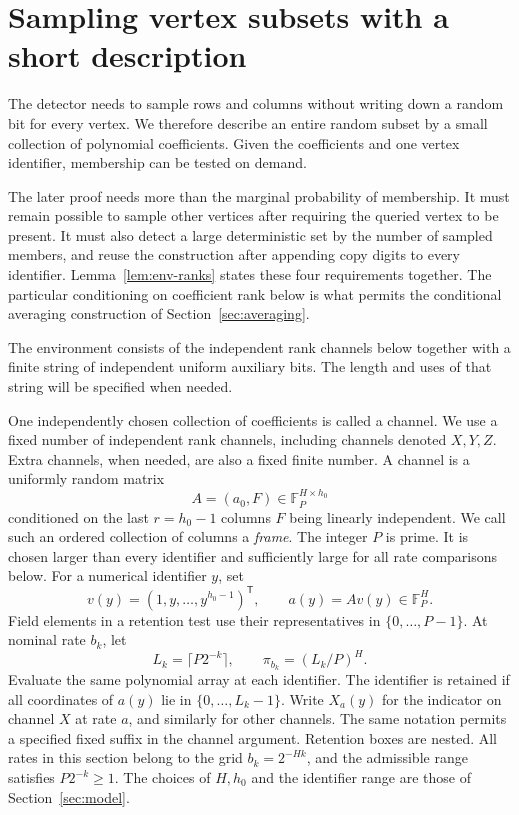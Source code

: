 \section{Sampling vertex subsets with a short description}\label{sec:env}

The detector needs to sample rows and columns without writing down a random bit for every vertex. We therefore describe an entire random subset by a small collection of polynomial coefficients. Given the coefficients and one vertex identifier, membership can be tested on demand.

The later proof needs more than the marginal probability of membership. It must remain possible to sample other vertices after requiring the queried vertex to be present. It must also detect a large deterministic set by the number of sampled members, and reuse the construction after appending copy digits to every identifier. Lemma~\ref{lem:env-ranks} states these four requirements together. The particular conditioning on coefficient rank below is what permits the conditional averaging construction of Section~\ref{sec:averaging}.

The environment consists of the independent rank channels below together
with a finite string of independent uniform auxiliary bits.  The length
and uses of that string will be specified when needed.

One independently chosen collection of coefficients is called a channel. We use a fixed number of independent rank channels, including channels denoted $X,Y,Z$. Extra channels, when needed, are also a fixed finite
number. A channel is a uniformly random matrix
\[
A=(a_0,F)\in\mathbb F_P^{H\times h_0}
\]
conditioned on the last $r=h_0-1$ columns $F$ being linearly
independent. We call such an ordered collection of columns a \emph{frame}.
The integer $P$ is prime. It is chosen larger than every
identifier and sufficiently large for all rate comparisons below.
For a numerical identifier $y$, set
\[
v(y)=(1,y,\ldots,y^{h_0-1})^{\mathsf T},
\qquad a(y)=Av(y)\in\mathbb F_P^H.
\]
Field elements in a retention test use their representatives in
$\{0,\ldots,P-1\}$. At nominal rate $b_k$, let
\[
L_k=\lceil P2^{-k}\rceil,\qquad
\pi_{b_k}=(L_k/P)^H.
\]
Evaluate the same polynomial array at each identifier. The identifier is retained if all coordinates of $a(y)$ lie in
$\{0,\ldots,L_k-1\}$. Write $X_a(y)$ for the indicator on channel
$X$ at rate $a$, and similarly for other channels.
The same notation permits a specified fixed suffix in the channel
argument. Retention boxes are nested.
All rates in this section belong to the grid $b_k=2^{-Hk}$, and the
admissible range satisfies $P2^{-k}\ge1$. The choices of $H,h_0$ and
the identifier range are those of Section~\ref{sec:model}.

